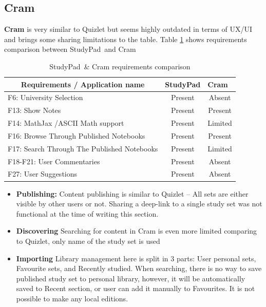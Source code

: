 \documentclass[thesis=B,english]{FITthesis}[2012/10/20]
\newcommand{\appname}{StudyPad}
\begin{document}
\subsection{Cram}
\textbf{Cram} is very similar to Quizlet but seems highly outdated in terms of UX/UI and brings some sharing limitations to the table. Table \ref{tab:cram} shows requirements comparison between \appname\ and Cram



\begin{table}[H]
\caption{\appname\ \& Cram requirements comparison}
\label{tab:cram}
\begin{tabular}{|l|c|c|}
\hline
\multicolumn{1}{|c|}{\textbf{Requirements / Application name}} & \multicolumn{1}{l|}{\textbf{StudyPad}} & \multicolumn{1}{l|}{\textbf{Cram}} \\ \hline
F6: University Selection                                       & Present                                & Absent                             \\ \hline
F13: Show Notes                                                & Present                                & Present                            \\ \hline
F14: MathJax /ASCII Math support                               & Present                                & Limited                            \\ \hline
F16: Browse Through Published Notebooks                        & Present                                & Present                            \\ \hline
F17: Search Through The Published Notebooks                    & Present                                & Limited                            \\ \hline
F18-F21: User Commentaries                                     & Present                                & Absent                             \\ \hline
F27: User Suggestions                                          & Present                                & Absent                             \\ \hline
\end{tabular}
\end{table}

\begin{itemize}
	\item  \textbf{Publishing:} Content publishing is similar to Quizlet -- All sets are either visible by other users or not. Sharing a deep-link to a single study set was not functional at the time of writing this section.
	\item \textbf{Discovering} Searching for content in Cram is even more limited comparing to Quizlet, only name of the study set is used
	\item \textbf{Importing} Library management here is split in 3 parts: User personal sets, Favourite sets, and Recently studied. When searching, there is no way to save published study set to personal library, however, it will be automatically saved to Recent section, or user can add it manually to Favourites. It is not possible to make any local editions.
\end{itemize}
\end{document}
